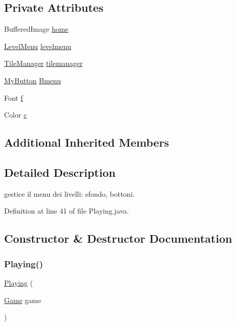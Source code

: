 \subsection*{Private Attributes}
\begin{DoxyCompactItemize}
\item 
Buffered\+Image \hyperlink{classscenes_1_1_playing_adfdf04838afb62818c2f3299d2a79095}{home}
\item 
\hyperlink{classui_1_1_level_menu}{Level\+Menu} \hyperlink{classscenes_1_1_playing_aca1e89235089681ebcb39681c50becae}{levelmenu}
\item 
\hyperlink{classmanagers_1_1_tile_manager}{Tile\+Manager} \hyperlink{classscenes_1_1_playing_a6d3aeeb21b7d0a3598a949b8c244f7bf}{tilemanager}
\item 
\hyperlink{classui_1_1_my_button}{My\+Button} \hyperlink{classscenes_1_1_playing_a3bcc199bdb1d50c111054398694c7473}{Bmenu}
\item 
Font \hyperlink{classscenes_1_1_playing_a3fb562f10e8f7f83cb2ed130eab6d439}{f}
\item 
Color \hyperlink{classscenes_1_1_playing_a02094092ae89aa4b23bff1976bcbf90d}{c}
\end{DoxyCompactItemize}
\subsection*{Additional Inherited Members}


\subsection{Detailed Description}
gestice il menu dei livelli\+: sfondo, bottoni. 

Definition at line 41 of file Playing.\+java.



\subsection{Constructor \& Destructor Documentation}
\mbox{\label{classscenes_1_1_playing_af94feaa0eefab45fb50a75c76679c2c7}} 
\subsubsection{\texorpdfstring{Playing()}{Playing()}}
{\footnotesize\ttfamily \hyperlink{classscenes_1_1_playing}{Playing} (\begin{DoxyParamCaption}\item[{\hyperlink{classprogetto_1_1_game}{Game}}]{game }\end{DoxyParamCaption})}



